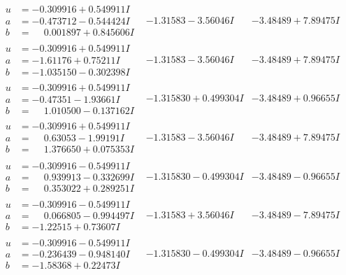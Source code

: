 \documentclass[1p]{elsarticle_modified}
\theoremstyle{definition}
\begin{document}
$$\begin{array}{c|c|c}
\begin{aligned}
u &= -0.309916 + 0.549911 I \\
a &= -0.473712 - 0.544424 I \\
b &= \phantom{-}0.001897 + 0.845606 I\end{aligned}
 & -1.31583 - 3.56046 I & -3.48489 + 7.89475 I \\ \hline\begin{aligned}
u &= -0.309916 + 0.549911 I \\
a &= -1.61176 + 0.75211 I \\
b &= -1.035150 - 0.302398 I\end{aligned}
 & -1.31583 - 3.56046 I & -3.48489 + 7.89475 I \\ \hline\begin{aligned}
u &= -0.309916 + 0.549911 I \\
a &= -0.47351 - 1.93661 I \\
b &= \phantom{-}1.010500 - 0.137162 I\end{aligned}
 & -1.315830 + 0.499304 I & -3.48489 + 0.96655 I \\ \hline\begin{aligned}
u &= -0.309916 + 0.549911 I \\
a &= \phantom{-}0.63053 - 1.99191 I \\
b &= \phantom{-}1.376650 + 0.075353 I\end{aligned}
 & -1.31583 - 3.56046 I & -3.48489 + 7.89475 I \\ \hline\begin{aligned}
u &= -0.309916 - 0.549911 I \\
a &= \phantom{-}0.939913 - 0.332699 I \\
b &= \phantom{-}0.353022 + 0.289251 I\end{aligned}
 & -1.315830 - 0.499304 I & -3.48489 - 0.96655 I \\ \hline\begin{aligned}
u &= -0.309916 - 0.549911 I \\
a &= \phantom{-}0.066805 - 0.994497 I \\
b &= -1.22515 + 0.73607 I\end{aligned}
 & -1.31583 + 3.56046 I & -3.48489 - 7.89475 I \\ \hline\begin{aligned}
u &= -0.309916 - 0.549911 I \\
a &= -0.236439 - 0.948140 I \\
b &= -1.58368 + 0.22473 I\end{aligned}
 & -1.315830 - 0.499304 I & -3.48489 - 0.96655 I \\ \hline\begin{aligned}

\end{aligned}
\end{array}$$
\end{document}
